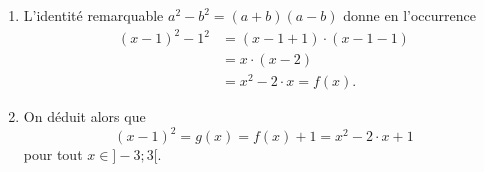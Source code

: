{\begin{enumerate}
\begin{center}
\begin{tikzpicture}[>=stealth]
			\end{tikzpicture}
			\end{center}
			
			
			\item 
			L'identité remarquable $a^2 - b^2 = (a+b)(a-b)$ donne en l'occurrence
				\begin{align*}
					(x-1)^2 - 1^2 &= (x-1+1) \cdot (x-1-1) \\
									&= x \cdot (x-2) \\
									&= x^2 - 2\cdot x = f(x).
				\end{align*}
			
			\item 
			On déduit alors que 
				\[ (x-1)^2 = g(x) = f(x) + 1 = x^2 - 2\cdot x + 1 \]
			pour tout $x\in]{-}3;3[$.
		\end{enumerate}
	
	}
	
